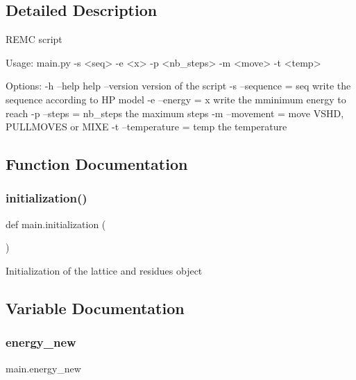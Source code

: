 \subsection{Detailed Description}
\begin{DoxyVerb}REMC script

Usage:
  main.py -s <seq> -e <x> -p <nb_steps> -m <move> -t <temp>

Options:
  -h --help                  help
  --version                  version of the script
  -s --sequence = seq        write the sequence according to HP model
  -e --energy = x            write the mminimum energy to reach
  -p --steps = nb_steps      the maximum steps
  -m --movement = move       VSHD, PULLMOVES or MIXE
  -t --temperature = temp    the temperature
\end{DoxyVerb}
 

\subsection{Function Documentation}
\mbox{\label{namespacemain_a36aaa6fc324305b9b0013cabac87a440}} 
\subsubsection{\texorpdfstring{initialization()}{initialization()}}
{\footnotesize\ttfamily def main.\+initialization (\begin{DoxyParamCaption}{ }\end{DoxyParamCaption})}

\begin{DoxyVerb}Initialization of the lattice and residues object
\end{DoxyVerb}
 

\subsection{Variable Documentation}
\mbox{\label{namespacemain_ad91de1ede17491633ae697d2af396fd4}} 
\subsubsection{\texorpdfstring{energy\+\_\+new}{energy\_new}}
{\footnotesize\ttfamily main.\+energy\+\_\+new}

